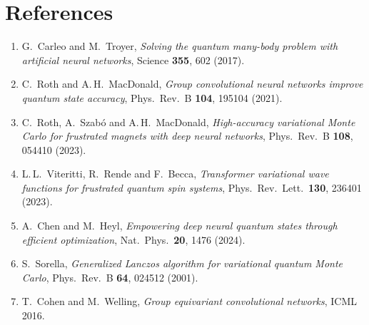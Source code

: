 \documentclass[11pt,a4paper]{article}
\theoremstyle{definition}
\theoremstyle{plain}
\begin{document}
\section*{References}
\begin{enumerate}\itemsep=2pt
   \item G.~Carleo and M.~Troyer, \emph{Solving the quantum many-body
         problem with artificial neural networks}, Science \textbf{355},
         602 (2017).
   \item C.~Roth and A.\,H.~MacDonald, \emph{Group convolutional neural
         networks improve quantum state accuracy}, Phys.\ Rev.\ B
         \textbf{104}, 195104 (2021).
   \item C.~Roth, A.~Szabó and A.\,H.~MacDonald, \emph{High-accuracy
         variational Monte Carlo for frustrated magnets with deep neural
         networks}, Phys.\ Rev.\ B \textbf{108}, 054410 (2023).
   \item L.\,L.~Viteritti, R.~Rende and F.~Becca, \emph{Transformer
         variational wave functions for frustrated quantum spin systems},
         Phys.\ Rev.\ Lett.\ \textbf{130}, 236401 (2023).
   \item A.~Chen and M.~Heyl, \emph{Empowering deep neural quantum states
         through efficient optimization}, Nat.\ Phys.\ \textbf{20}, 1476
         (2024).
   \item S.~Sorella, \emph{Generalized Lanczos algorithm for variational
         quantum Monte Carlo}, Phys.\ Rev.\ B \textbf{64}, 024512 (2001).
   \item T.~Cohen and M.~Welling, \emph{Group equivariant convolutional
         networks}, ICML 2016.
\end{enumerate}
\end{document}
